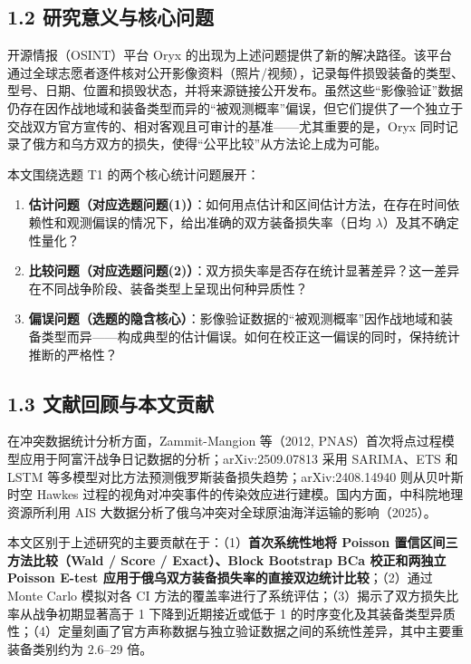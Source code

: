 \documentclass[
  a4paper,
  fontset=none,
]{ctexart}
\providecommand{\tightlist}{%
  \setlength{\itemsep}{0pt}\setlength{\parskip}{0pt}}
\begin{document}
\hypertarget{ux7814ux7a76ux610fux4e49ux4e0eux6838ux5fc3ux95eeux9898}{%
\subsection{1.2
研究意义与核心问题}\label{ux7814ux7a76ux610fux4e49ux4e0eux6838ux5fc3ux95eeux9898}}

开源情报（OSINT）平台 Oryx
的出现为上述问题提供了新的解决路径。该平台通过全球志愿者逐件核对公开影像资料（照片/视频），记录每件损毁装备的类型、型号、日期、位置和损毁状态，并将来源链接公开发布。虽然这些``影像验证''数据仍存在因作战地域和装备类型而异的``被观测概率''偏误，但它们提供了一个独立于交战双方官方宣传的、相对客观且可审计的基准------尤其重要的是，Oryx
同时记录了俄方和乌方双方的损失，使得``公平比较''从方法论上成为可能。

本文围绕选题 T1 的两个核心统计问题展开：

\begin{enumerate}
\def\labelenumi{\arabic{enumi}.}
\tightlist
\item
  \textbf{估计问题（对应选题问题(1)）}：如何用点估计和区间估计方法，在存在时间依赖性和观测偏误的情况下，给出准确的双方装备损失率（日均
  \(\lambda\)）及其不确定性量化？
\item
  \textbf{比较问题（对应选题问题(2)）}：双方损失率是否存在统计显著差异？这一差异在不同战争阶段、装备类型上呈现出何种异质性？
\item
  \textbf{偏误问题（选题的隐含核心）}：影像验证数据的``被观测概率''因作战地域和装备类型而异------构成典型的估计偏误。如何在校正这一偏误的同时，保持统计推断的严格性？
\end{enumerate}

\hypertarget{ux6587ux732eux56deux987eux4e0eux672cux6587ux8d21ux732e}{%
\subsection{1.3
文献回顾与本文贡献}\label{ux6587ux732eux56deux987eux4e0eux672cux6587ux8d21ux732e}}

在冲突数据统计分析方面，Zammit-Mangion 等（2012,
PNAS）首次将点过程模型应用于阿富汗战争日记数据的分析；arXiv:2509.07813
采用 SARIMA、ETS 和 LSTM
等多模型对比方法预测俄罗斯装备损失趋势；arXiv:2408.14940 则从贝叶斯时空
Hawkes
过程的视角对冲突事件的传染效应进行建模。国内方面，中科院地理资源所利用
AIS 大数据分析了俄乌冲突对全球原油海洋运输的影响（2025）。

本文区别于上述研究的主要贡献在于：（1）\textbf{首次系统性地将
Poisson 置信区间三方法比较（Wald / Score / Exact）、Block Bootstrap BCa
校正和两独立 Poisson E-test
应用于俄乌双方装备损失率的直接双边统计比较}；（2）通过 Monte Carlo
模拟对各 CI
方法的覆盖率进行了系统评估；（3）揭示了双方损失比率从战争初期显著高于 1
下降到近期接近或低于 1
的时序变化及其装备类型异质性；（4）定量刻画了官方声称数据与独立验证数据之间的系统性差异，其中主要重装备类别约为
2.6--29 倍。
\end{document}
